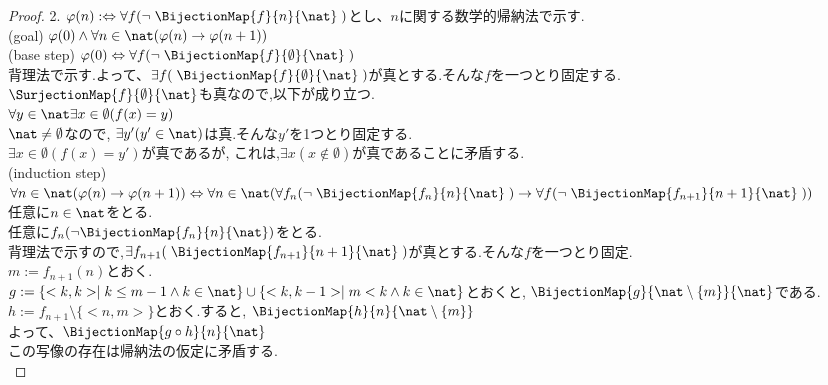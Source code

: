 \begin{proof} 2. $\varphi (n) :\Leftrightarrow \forall f( \lnot \; \BijectionMap{f}{n}{\nat} \; )$とし、$n$に関する数学的帰納法で示す.\\
(goal) $\varphi (0) \land \forall n \in \nat ( \varphi (n) \rightarrow \varphi (n+1))$\\

(base step) $\varphi (0) \Leftrightarrow  \forall f( \lnot \; \BijectionMap{f}{\emptyset}{\nat} \; )$ \\
背理法で示す.よって、$\exists f(  \; \BijectionMap{f}{\emptyset}{\nat} \; )$が真とする.そんな$f$を一つとり固定する.\\
$\SurjectionMap{f}{\emptyset}{\nat}$も真なので,以下が成り立つ.\\
$\forall y \in \nat \exists x \in \emptyset (f(x) = y)$\\
$\nat \neq \emptyset$なので,
$\exists y'(y' \in \nat)$は真.そんな$y'$を1つとり固定する.\\
$\exists x \in \emptyset (f(x) = y')$が真であるが,
これは,$\exists x (x \not\in \emptyset)$が真であることに矛盾する.\\

(induction step) $\forall n \in \nat ( \varphi (n) \rightarrow \varphi (n+1)) 
\Leftrightarrow \forall n \in \nat ( \forall f_n( \lnot \; \BijectionMap{f_n}{n}{\nat} \; ) \rightarrow \forall f( \lnot \; \BijectionMap{f_{n+1}}{n+1}{\nat} \; ))$\\
任意に$n \in \nat$をとる.\\
任意に$f_n(\lnot \BijectionMap{f_n}{n}{\nat})$をとる.\\
背理法で示すので,$\exists f_{n+1}(\; \BijectionMap{f_{n+1}}{n+1}{\nat} \; )$が真とする.そんな$f$を一つとり固定.\\
$m := f_{n+1}(n)$とおく.\\
$g:=\{<k,k> \mid k \leq m-1 \land k \in \nat\} \cup \{<k,k-1> \mid m < k \land k \in \nat\}$とおくと,
$\BijectionMap{g}{\nat \setminus \{m\}}{\nat}$である.\\
$h:= f_{n+1} \setminus \{<n, m>\}$とおく.すると,
$\BijectionMap{h}{n}{\nat \setminus \{m\}}$\\
よって、$\BijectionMap{g \circ h}{n}{\nat}$\\
この写像の存在は帰納法の仮定に矛盾する.\\
\end{proof}
